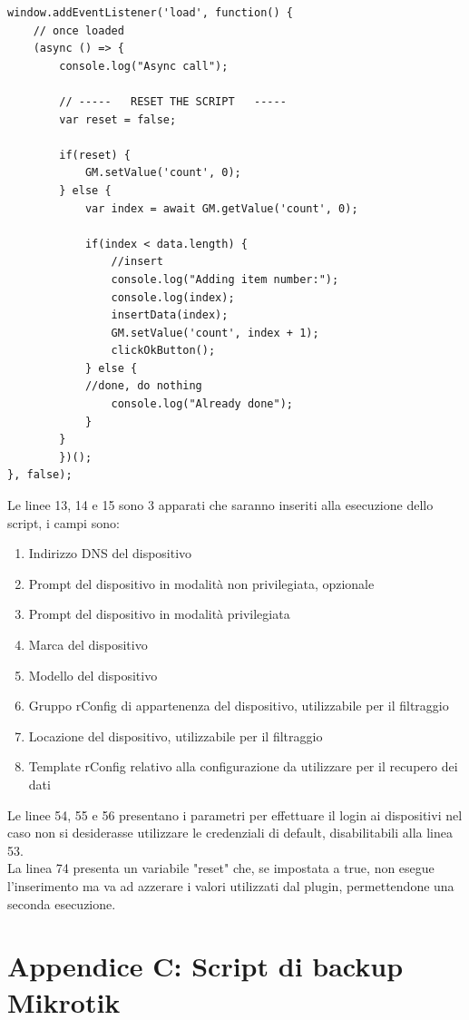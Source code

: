 \documentclass[Tesi.tex]{subfiles}
\begin{document}
\begin{lstlisting}[caption=Script GreaseMonkey di popolamento rConfig]
window.addEventListener('load', function() {
	// once loaded
	(async () => {
		console.log("Async call");
		
		// -----   RESET THE SCRIPT   -----
		var reset = false;
		
		if(reset) {
			GM.setValue('count', 0);
		} else {
			var index = await GM.getValue('count', 0);
			
			if(index < data.length) {
				//insert
				console.log("Adding item number:");
				console.log(index);
				insertData(index);
				GM.setValue('count', index + 1);
				clickOkButton();
			} else {
			//done, do nothing
				console.log("Already done");
			}   
		}
		})();
}, false);

\end{lstlisting}

Le linee 13, 14 e 15 sono 3 apparati che saranno inseriti alla esecuzione dello script, i campi sono:
\begin{enumerate}
	\item Indirizzo DNS del dispositivo
	\item Prompt del dispositivo in modalità non privilegiata, opzionale
	\item Prompt del dispositivo in modalità privilegiata
	\item Marca del dispositivo
	\item Modello del dispositivo
	\item Gruppo rConfig di appartenenza del dispositivo, utilizzabile per il filtraggio
	\item Locazione del dispositivo, utilizzabile per il filtraggio
	\item Template rConfig relativo alla configurazione da utilizzare per il recupero dei dati
\end{enumerate}

Le linee 54, 55 e 56 presentano i parametri per effettuare il login ai dispositivi nel caso non si desiderasse utilizzare le credenziali di default, disabilitabili alla linea 53. \\
La linea 74 presenta un variabile "reset" che, se impostata a true, non esegue l'inserimento ma va ad azzerare i valori utilizzati dal plugin, permettendone una seconda esecuzione.


\label{sec:Appendice C}
\section*{Appendice C: Script di backup Mikrotik}
\end{document}
